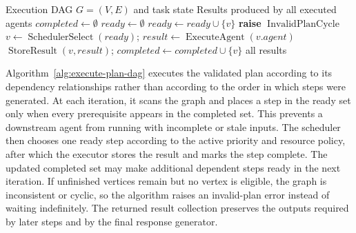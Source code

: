 \begin{algorithm}[H]
\caption{Dependency-Aware Agent DAG Execution}
\label{alg:execute-plan-dag}
\begin{algorithmic}[1]
\Require Execution DAG $G=(V,E)$ and task state
\Ensure Results produced by all executed agents
\State $completed\gets\emptyset$
    \State $ready\gets\emptyset$
            \State $ready\gets ready\cup\{v\}$
        \EndIf
    \EndFor
     \State \textbf{raise} $\operatorname{InvalidPlanCycle}$ \EndIf
    \State $v\gets\operatorname{SchedulerSelect}(ready)$; $result\gets\operatorname{ExecuteAgent}(v.agent)$
    \State $\operatorname{StoreResult}(v,result)$; $completed\gets completed\cup\{v\}$
\EndWhile
\State \Return all results
\end{algorithmic}
\end{algorithm}
Algorithm~\ref{alg:execute-plan-dag} executes the validated plan according to its dependency relationships rather than according to the order in which steps were generated. At each iteration, it scans the graph and places a step in the ready set only when every prerequisite appears in the completed set. This prevents a downstream agent from running with incomplete or stale inputs. The scheduler then chooses one ready step according to the active priority and resource policy, after which the executor stores the result and marks the step complete. The updated completed set may make additional dependent steps ready in the next iteration. If unfinished vertices remain but no vertex is eligible, the graph is inconsistent or cyclic, so the algorithm raises an invalid-plan error instead of waiting indefinitely. The returned result collection preserves the outputs required by later steps and by the final response generator.

